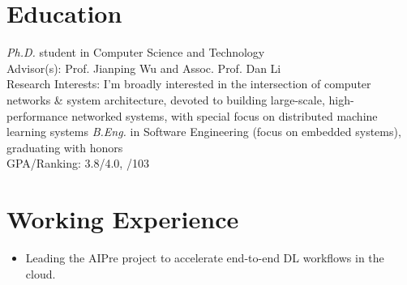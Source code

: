 \documentclass{resume}
\begin{document}



\section{Education}
\textit{Ph.D.} student in Computer Science and Technology\\
Advisor(s): Prof. Jianping Wu and Assoc. Prof. Dan Li\\
Research Interests: I'm broadly interested in the intersection of computer networks \& system architecture, devoted to building large-scale, high-performance networked systems, with special focus on distributed machine learning systems
\textit{B.Eng.} in Software Engineering (focus on embedded systems), graduating with honors\\
GPA/Ranking: 3.8/4.0,  \nth{1}/103

\section{Working Experience}
\begin{itemize}
	\item Leading the AIPre project to accelerate end-to-end DL workflows in the cloud.
\end{itemize}
\end{document}
